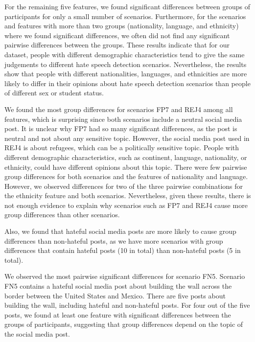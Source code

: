 %
For the remaining five features, we found significant differences between groups of participants for only a small number of scenarios.
%
Furthermore, for the scenarios and features with more than two groups (nationality, language, and ethnicity) where we found significant differences, we often did not find any significant pairwise differences between the groups.
%
These results indicate that for our dataset, people with different demographic characteristics tend to give the same judgements to different hate speech detection scenarios.
%
Nevertheless, the results show that people with different nationalities, languages, and ethnicities are more likely to differ in their opinions about hate speech detection scenarios than people of different sex or student status.
%


%
We found the most group differences for scenarios FP7 and REJ4 among all features, which is surprising since both scenarios include a neutral social media post.
%
It is unclear why FP7 had so many significant differences, as the post is neutral and not about any sensitive topic.
%
However, the social media post used in REJ4 is about refugees, which can be a politically sensitive topic.
%
People with different demographic characteristics, such as continent, language, nationality, or ethnicity, could have different opinions about this topic.
%
There were few pairwise group differences for both scenarios and the features of nationality and language.
%
However, we observed differences for two of the three pairwise combinations for the ethnicity feature and both scenarios.
%
Nevertheless, given these results, there is not enough evidence to explain why scenarios such as FP7 and REJ4 cause more group differences than other scenarios.
%

%
Also, we found that hateful social media posts are more likely to cause group differences than non-hateful posts, as we have more scenarios with group differences that contain hateful posts (10 in total) than non-hateful posts (5 in total).
%

%
We observed the most pairwise significant differences for scenario FN5.
%
Scenario FN5 contains a hateful social media post about building the wall across the border between the United States and Mexico.
%
There are five posts about building the wall, including hateful and non-hateful posts.
%
For four out of the five posts, we found at least one feature with significant differences between the groups of participants, suggesting that group differences depend on the topic of the social media post.
%


